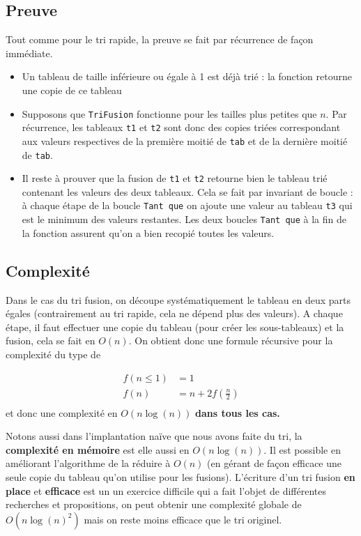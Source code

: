 \documentclass{../cours}
\begin{document}
\subsection{Preuve}

Tout comme pour le tri rapide, la preuve se fait par récurrence de façon immédiate.

\begin{itemize}
\item Un tableau de taille inférieure ou égale à 1 est déjà trié : la fonction retourne une copie de ce tableau
\item Supposons que {\tt TriFusion} fonctionne pour les tailles plus petites que $n$. Par récurrence, les tableaux {\tt t1} et
{\tt t2} sont donc des copies triées correspondant aux valeurs respectives de la première moitié de {\tt tab} et de la dernière moitié de {\tt tab}. 
\item Il reste à prouver que la fusion de {\tt t1} et {\tt t2} retourne bien le tableau trié contenant les valeurs des deux tableaux. Cela se fait par invariant de boucle : à chaque étape de la boucle {\tt Tant que} on ajoute une valeur au tableau {\tt t3} qui est le minimum des valeurs restantes. Les deux boucles {\tt Tant que} à la fin de la fonction assurent qu'on a bien recopié toutes les valeurs.
\end{itemize}

\subsection{Complexité}

Dans le cas du tri fusion, on découpe systématiquement le tableau en deux parts égales (contrairement au tri rapide, cela ne dépend plus des valeurs). A chaque étape, il faut effectuer une copie du tableau (pour créer les sous-tableaux) et la fusion, cela se fait en $O(n)$. On obtient donc une formule récursive pour la complexité du type de

\begin{align}
f( n \leq 1) &= 1 \\
f(n) &= n + 2 f \left(\frac{n}{2} \right) \\
\end{align}
et donc une complexité en $O(n \log(n))$ \textbf{dans tous les cas.}

Notons aussi dans l'implantation naïve que nous avons faite du tri, la \textbf{complexité en mémoire} est elle aussi en $O(n \log(n))$. Il est possible en améliorant l'algorithme de la réduire à $O(n)$ (en gérant de façon efficace une seule copie du tableau qu'on utilise pour les fusions). L'écriture d'un tri fusion \textbf{en place} et \textbf{efficace} est un un exercice difficile qui a fait l'objet de différentes recherches et propositions, on peut obtenir une complexité globale de $O(n \log(n)^2)$ mais on reste moins efficace que le tri originel.
\end{document}

